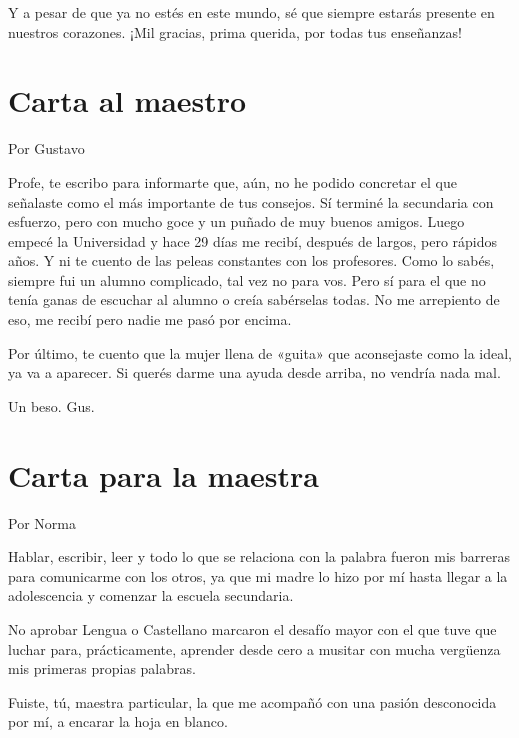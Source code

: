 \documentclass[11pt,twoside,openright,a5paper]{book}
\begin{document}
Y a pesar de que ya no estés en este mundo, sé que siempre estarás presente en nuestros corazones. ¡Mil gracias, prima querida, por todas tus enseñanzas!
\clearpage
\section*{Carta al maestro}

\begin{flushright}Por Gustavo\end{flushright}

Profe, te escribo para informarte que, aún, no he podido concretar el que señalaste como el más importante de tus consejos. Sí terminé la secundaria con esfuerzo, pero con mucho goce y un puñado de muy buenos amigos. Luego empecé la Universidad y hace 29 días me recibí, después  de largos, pero rápidos años. Y ni te cuento de las peleas constantes con los profesores. Como lo sabés, siempre fui un alumno complicado, tal vez no para vos. Pero sí para el que no tenía ganas de escuchar al alumno o creía sabérselas todas. No me arrepiento de eso, me recibí pero nadie me pasó por encima.

Por último, te cuento que la mujer llena de «guita»  que aconsejaste como la ideal, ya va a aparecer. Si querés darme una ayuda desde arriba, no vendría nada mal.

Un beso. Gus.


\section*{Carta para la maestra}
                                                                          \begin{flushright}Por Norma\end{flushright}

Hablar, escribir, leer y todo lo que se relaciona con la palabra fueron mis barreras para comunicarme con los otros, ya que mi madre lo hizo por mí hasta llegar a la adolescencia y comenzar la escuela secundaria.

No aprobar Lengua o Castellano marcaron el desafío mayor con el que tuve que luchar para, prácticamente, aprender desde cero a musitar con mucha vergüenza mis primeras propias palabras.

Fuiste, tú, maestra particular, la que me acompañó con una pasión desconocida por mí,  a encarar la hoja en blanco.
\end{document}

